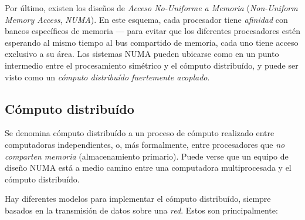 \documentclass[11pt,fleqn]{book} %
\begin{document}
Por último, existen los diseños de \emph{Acceso No-Uniforme a Memoria}
(\emph{Non-Uniform Memory Access}, \emph{NUMA}). En este esquema, cada
procesador tiene \emph{afinidad} con bancos específicos de memoria — para
evitar que los diferentes procesadores estén esperando al mismo tiempo
al bus compartido de memoria, cada uno tiene acceso exclusivo a su
área. Los sistemas NUMA pueden ubicarse como en un punto intermedio
entre el procesamiento simétrico y el cómputo distribuído, y puede ser
visto como un \emph{cómputo distribuído fuertemente acoplado}.
\subsection{Cómputo distribuído}
\label{sec-2-9-2}


Se denomina cómputo distribuído a un proceso de cómputo realizado
entre computadoras independientes, o, más formalmente, entre
procesadores que \emph{no comparten memoria} (almacenamiento primario).
Puede verse que un equipo de diseño NUMA está a medio camino entre una
computadora multiprocesada y el cómputo distribuído.

Hay diferentes modelos para implementar el cómputo distribuído,
siempre basados en la transmisión de datos sobre una \emph{red}. Estos son
principalmente:
\end{document}
